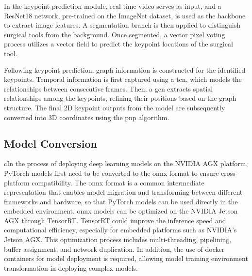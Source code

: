 \documentclass[12pt]{article}
\begin{document}
In the keypoint prediction module, real-time video serves as input, and a ResNet18 network, pre-trained on the ImageNet dataset, is used as the backbone to extract image features. A segmentation branch is then applied to distinguish surgical tools from the background. Once segmented, a vector pixel voting process utilizes a vector field to predict the keypoint locations of the surgical tool\cite{xu2023graph}.

Following keypoint prediction, graph information is constructed for the identified keypoints. Temporal information is first captured using a \gls{tcn}\cite{zeng2020srnet}, which models the relationships between consecutive frames. Then, a \gls{gcn}\cite{yan2018spatial} extracts spatial relationships among the keypoints, refining their positions based on the graph structure\cite{xu2023graph}. The final 2D keypoint outputs from the model are subsequently converted into 3D coordinates using the \gls{pnp} algorithm\cite{yun2017object}.


\subsection{Model Conversion}
cIn the process of deploying deep learning models on the NVIDIA AGX platform, PyTorch models first need to be converted to the \gls{onnx} format to ensure cross-platform compatibility. The \gls{onnx} format is a common intermediate representation that enables model migration and transforming between different frameworks and hardware, so that PyTorch models can be used directly in the embedded environment. \gls{onnx} models can be optimized on the NVIDIA Jetson AGX through TensorRT. TensorRT could improve the inference speed and computational efficiency, especially for embedded platforms such as NVIDIA's Jetson AGX. This optimization process includes multi-threading, pipelining, buffer assignment, and network duplication\cite{Jeong2022TensorRTBasedFA}\cite{karumbunathan2022nvidia}. In addition, the use of docker containers for model deployment is required, allowing model training environment transformation in deploying complex models\cite{10283807}.
\end{document}
